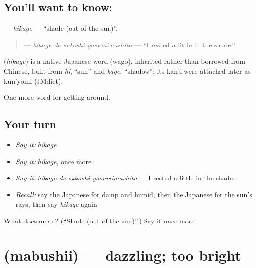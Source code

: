 \subsection*{You'll want to know: }
\textbf{} — \emph{hikage} — \textquotedblleft{}shade (out of the sun)\textquotedblright{}.

\begin{quote}
\textbf{  } — \emph{hikage de sukoshi yasumimashita} — \textquotedblleft{}I rested a little in the shade.\textquotedblright{}
\end{quote}

\begin{cousinweb}
\textbf{} (\emph{hikage}) is a native Japanese word (wago), inherited rather than borrowed from Chinese, built from \emph{hi}, \textquotedblleft{}sun\textquotedblright{} and \emph{kage}, \textquotedblleft{}shadow\textquotedblright{}; its kanji were attached later as kun'yomi (JMdict).
\end{cousinweb}

\begin{grammarlens}[title={What you've built}]
One more word for getting around.
\end{grammarlens}

\subsection*{Your turn}
\begin{itemize}
\raggedright
  \item \emph{Say it:} \emph{hikage}
  \item \emph{Say it:} \emph{hikage}, once more
  \item \emph{Say it:} \emph{hikage de sukoshi yasumimashita} — I rested a little in the shade.
  \item \emph{Recall:} say the Japanese for damp and humid, then the Japanese for the sun's rays, then say \emph{hikage} again
\end{itemize}

\begin{tcolorbox}[breakable,colback=teal!4,colframe=teal!35!black,title={Before you move on}]
What does  mean? (\textquotedblleft{}Shade (out of the sun)\textquotedblright{}.) Say it once more.
\end{tcolorbox}
\section[\texorpdfstring{\ja{まぶしい} (mabushii)}{まぶしい (mabushii)}]{ (mabushii) — dazzling; too bright}

